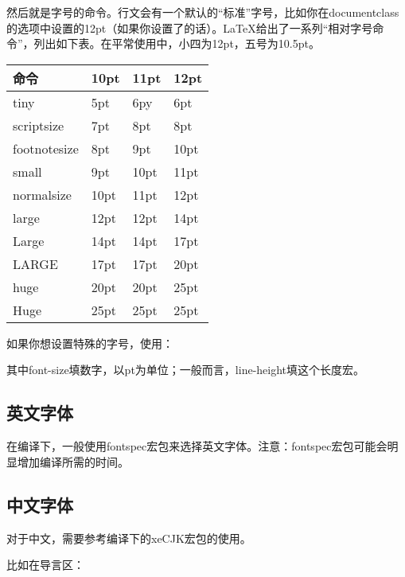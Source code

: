 {然后就是字号的命令。行文会有一个默认的“标准”字号，比如你在documentclass的选项中设置的12pt（如果你设置了的话）。\LaTeX 给出了一系列“相对字号命令”，列出如下表。在平常使用中，小四为12pt，五号为10.5pt。
\begin{center}
\begin{tabular}{|>{\ttfamily\char92}l|*{3}{l|}}
\hline
命令         & 10pt & 11pt & 12pt \\
\hline
tiny         & 5pt  & 6py  & 6pt  \\
scriptsize   & 7pt  & 8pt  & 8pt  \\
footnotesize & 8pt  & 9pt  & 10pt \\
small        & 9pt  & 10pt & 11pt \\
normalsize   & 10pt & 11pt & 12pt \\
large        & 12pt & 12pt & 14pt \\
Large        & 14pt & 14pt & 17pt \\
LARGE        & 17pt & 17pt & 20pt \\
huge         & 20pt & 20pt & 25pt \\
Huge         & 25pt & 25pt & 25pt \\
\hline
\end{tabular}
\end{center}

如果你想设置特殊的字号，使用：
\begin{latex}{}
\end{latex}

其中font-size填数字，以pt为单位；一般而言，line-height填\latexline{\\baselineskip}这个长度宏。

\subsection{英文字体}
在\xelatex 编译下，一般使用fontspec宏包来选择英文字体。注意：fontspec宏包可能会明显增加编译所需的时间。
\begin{latex}{}
\usepackage{fontspec}
\end{latex}

\subsection{中文字体}
对于中文，需要参考\xelatex 编译下的xeCJK宏包的使用。

比如在导言区：
\begin{latex}{}
\usepackage[slantfont,boldfont]{xeCJK}
\end{latex}

}
